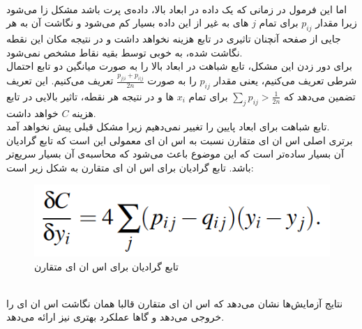 \\
اما این فرمول در زمانی که یک داده در ابعاد بالا،
{داده‌ی پرت}
باشد مشکل زا می‌شود زیرا مقدار $p_{ij}$ برای تمام $j$ های به غیر از این داده بسیار کم می‌شود و نگاشت آن به هر جایی از صفحه آنچنان تاثیری در تابع هزینه نخواهد داشت و در نتیجه مکان این نقطه نگاشت شده، به خوبی توسط بقیه نقاط مشخص نمی‌شود.
\\
برای دور زدن این مشکل، تابع شباهت در ابعاد بالا را به صورت میانگین دو تابع احتمال شرطی تعریف می‌کنیم، یعنی مقدار $p_{ij}$ را به صورت
$\frac{p_{j|i} + p_{i|j}}{2n}$
تعریف می‌کنیم. این تعریف تضمین می‌دهد که
$\sum_j {p_{ij}} > \frac{1}{2n}$
برای تمام
$x_i$
ها و در نتیجه هر نقطه، تاثیر بالایی در تابع هزینه $C$ خواهد داشت.
\\
تابع شباهت برای ابعاد پایین را تغییر نمی‌دهیم زیرا مشکل قبلی پیش نخواهد آمد.
\\
برتری اصلی اس ان ای متقارن نسبت به اس ان ای معمولی این است که تابع گرادیان آن بسیار ساده‌تر است که این موضوع باعث می‌شود که محاسبه‌ی آن بسیار سریع‌تر باشد. تابع گرادیان برای اس ان ای متقارن به شکل زیر است:
\begin{figure}[!h]
	\centering\includegraphics[scale=.3]{eq11}
	\caption{تابع گرادیان برای اس ان ای متقارن}\label{fig.eq11}
\end{figure}
\\
نتایج آزمایش‌ها نشان می‌دهد که اس ان ای متقارن قالبا همان نگاشت اس ان ای را خروجی می‌دهد و گاها عملکرد بهتری نیز ارائه می‌دهد.

